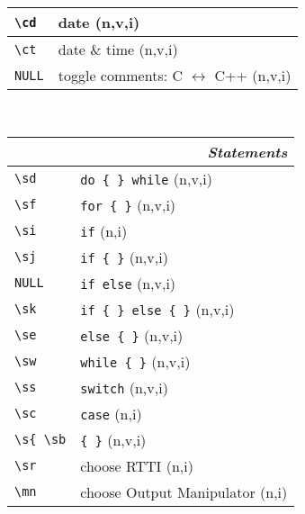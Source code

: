 \documentclass[oneside,11pt,landscape,DIV16]{scrartcl}
\begin{document}
\begin{multicols}{3}
\begin{center}
\begin{tabular}[]{|p{10mm}|p{60mm}|}
\hline \verb'\cd'     & date                                    \hfill (n,v,i)                                   \\
\hline \verb'\ct'     & date \& time                            \hfill (n,v,i)                                   \\
\hline \verb'NULL'    & toggle comments: C $\leftrightarrow$ C++                  \hfill (n,v,i)                 \\
\hline 
\end{tabular}\\
%
%
\begin{tabular}[]{|p{15mm}|p{55mm}|}
\hline
\multicolumn{2}{|r|}{\textsl{\textbf{S}tatements}} \\
\hline \verb'\sd'     & \verb'do { } while'        \hfill (n,v,i)           \\
\hline \verb'\sf'     & \verb'for { }'             \hfill (n,v,i)           \\
\hline \verb'\si'     & \verb'if'                  \hfill (n,i)             \\
\hline \verb'\sj'     & \verb'if { }'              \hfill (n,v,i)           \\
\hline \verb'NULL'    & \verb'if else'             \hfill (n,v,i)           \\
\hline \verb'\sk'     & \verb'if { } else { }'     \hfill (n,v,i)           \\
\hline \verb'\se'     & \verb'else { }'            \hfill (n,v,i)           \\
\hline \verb'\sw'     & \verb'while { }'           \hfill (n,v,i)           \\
\hline \verb'\ss'     & \verb'switch'              \hfill (n,v,i)           \\
\hline \verb'\sc'     & \verb'case'                \hfill (n,i)             \\
\hline \verb'\s{ \sb' & \verb'{ }'                 \hfill (n,v,i)               \\
\hline \verb'\sr'     & choose RTTI                \hfill (n,i)            \\
\hline \verb'\mn'     & choose Output Manipulator  \hfill (n,i) \\

\end{tabular}
\end{center}
\end{multicols}
\end{document}
